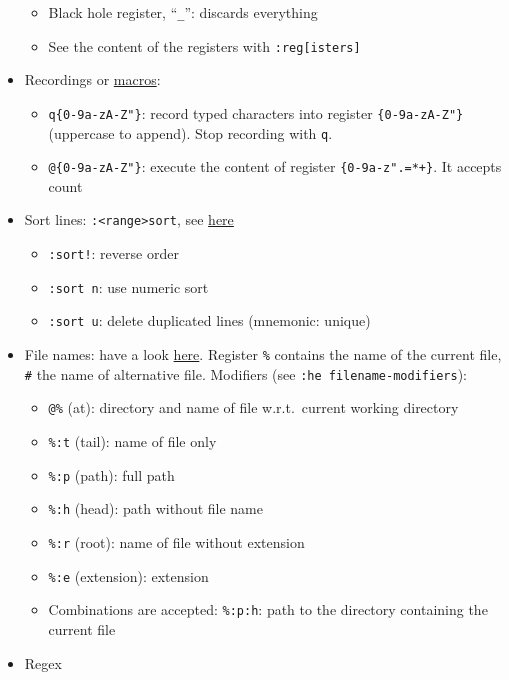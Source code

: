 \documentclass[a4paper,12pt,%
              final%
              ]{article}
\begin{document}
\begin{itemize}
\begin{itemize}
      \item Black hole register, ``\verb|_|'': discards everything
      \item See the content of the registers with \verb|:reg[isters]|
    \end{itemize}
  \item Recordings or
    \href{https://vim.fandom.com/wiki/Macros#Viewing_a_macro}{macros}:
    \begin{itemize}
      \item \verb|q{0-9a-zA-Z"}|: record typed characters into register
        \verb|{0-9a-zA-Z"}| (uppercase to append). Stop recording with \verb|q|.
      \item \verb|@{0-9a-zA-Z"}|: execute the content of register
        \verb|{0-9a-z".=*+}|. It accepts count
    \end{itemize}
  \item Sort lines: \verb|:<range>sort|, see \href{https://vim.fandom.com/wiki/Sort_lines}{here}
    \begin{itemize}
      \item \verb|:sort!|: reverse order
      \item \verb|:sort n|: use numeric sort
      \item \verb|:sort u|: delete duplicated lines (mnemonic: unique)
    \end{itemize}
  \item File names: have a look \href{https://vim.fandom.com/wiki/Get_the_name_of_the_current_file}{here}.
    Register \verb|%| contains the name of the current file, \verb|#| the name of alternative file.
    Modifiers (see \verb|:he filename-modifiers|):
    \begin{itemize}
      \item \verb|@%| (at): directory and name of file w.r.t.~current working directory
      \item \verb|%:t| (tail): name of file only
      \item \verb|%:p| (path): full path
      \item \verb|%:h| (head): path without file name
      \item \verb|%:r| (root): name of file without extension
      \item \verb|%:e| (extension): extension
      \item Combinations are accepted: \verb|%:p:h|: path to the directory containing the current file
    \end{itemize}
  \item Regex
    \begin{itemize}

\end{itemize}
\end{itemize}
\end{document}
